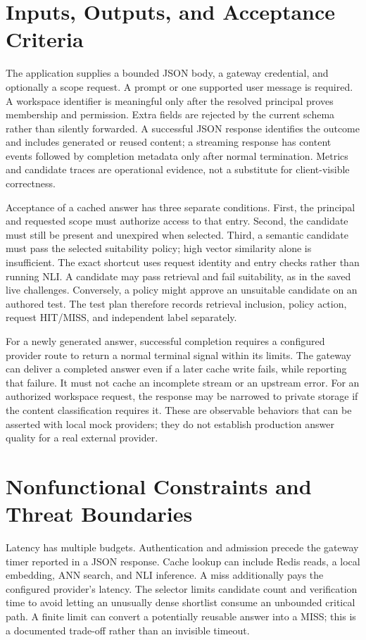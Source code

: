 \section{Inputs, Outputs, and Acceptance Criteria}
The application supplies a bounded JSON body, a gateway credential, and optionally a scope request. A prompt or one supported user message is required. A workspace identifier is meaningful only after the resolved principal proves membership and permission. Extra fields are rejected by the current schema rather than silently forwarded. A successful JSON response identifies the outcome and includes generated or reused content; a streaming response has content events followed by completion metadata only after normal termination. Metrics and candidate traces are operational evidence, not a substitute for client-visible correctness.

Acceptance of a cached answer has three separate conditions. First, the principal and requested scope must authorize access to that entry. Second, the candidate must still be present and unexpired when selected. Third, a semantic candidate must pass the selected suitability policy; high vector similarity alone is insufficient. The exact shortcut uses request identity and entry checks rather than running NLI. A candidate may pass retrieval and fail suitability, as in the saved live challenges. Conversely, a policy might approve an unsuitable candidate on an authored test. The test plan therefore records retrieval inclusion, policy action, request HIT/MISS, and independent label separately.

For a newly generated answer, successful completion requires a configured provider route to return a normal terminal signal within its limits. The gateway can deliver a completed answer even if a later cache write fails, while reporting that failure. It must not cache an incomplete stream or an upstream error. For an authorized workspace request, the response may be narrowed to private storage if the content classification requires it. These are observable behaviors that can be asserted with local mock providers; they do not establish production answer quality for a real external provider.

\section{Nonfunctional Constraints and Threat Boundaries}
Latency has multiple budgets. Authentication and admission precede the gateway timer reported in a JSON response. Cache lookup can include Redis reads, a local embedding, ANN search, and NLI inference. A miss additionally pays the configured provider's latency. The selector limits candidate count and verification time to avoid letting an unusually dense shortlist consume an unbounded critical path. A finite limit can convert a potentially reusable answer into a MISS; this is a documented trade-off rather than an invisible timeout.

